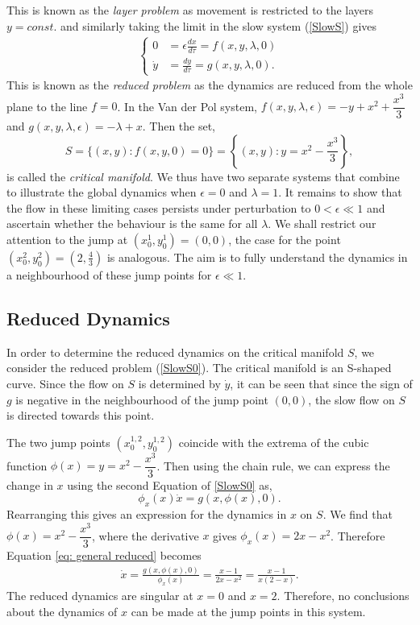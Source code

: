 This is known as the \emph{layer problem} as movement is restricted to the layers $y=const.$ and similarly taking the limit in the slow system (\ref{SlowS}) gives
	\begin{align}\label{SlowS0}
		\begin{cases}
			0 &= \epsilon \frac{dx}{d \tau} = f(x,y,\lambda, 0)\\
			\dot{y} & = \frac{dy}{d \tau} =  g( x,y, \lambda,0).
		\end{cases}
	\end{align}
This is known as the \emph{reduced problem} as the dynamics are reduced from the whole plane to the line $f=0$. In the Van der Pol system, $f(x,y,\lambda,\epsilon)=-y+x^2+\dfrac{x^3}{3}$ and $g(x,y,\lambda,\epsilon)=-\lambda+x$. Then the set,
\begin{equation}
 S= \{ (x,y) : f(x,y,0)=0 \} = \left\{ (x,y) : y = x^2-\dfrac{x^3}{3}\right \},\label{CriticalS}
\end{equation} 
is called the \emph{critical manifold}. We thus have two separate systems that combine to illustrate the global dynamics when $\epsilon =0$ and $\lambda = 1$. It remains to show that the flow in these limiting cases persists under perturbation to $0<\epsilon \ll 1$ and ascertain whether the behaviour is the same for all $\lambda$. We shall restrict our attention to the jump at $ (x^1_0,y^1_0)=(0,0)$, the case for the point $(x^2_0,y^2_0)=(2,\frac{4}{3})$ is analogous. The aim is to fully understand the dynamics in a neighbourhood of these jump points for $\epsilon \ll 1$.

\subsection{Reduced Dynamics}
In order to determine the reduced dynamics on the critical manifold $S$, we consider the reduced problem (\ref{SlowS0}). The critical manifold is  an S-shaped curve. Since the flow on $S$ is determined by $\dot{y}$, it can be seen that since the sign of $g$ is negative in the neighbourhood of the jump point $(0,0)$, the slow flow on $S$ is directed towards this point.

The two jump points $(x_0^{1,2},y_0^{1,2})$ coincide with the extrema of the cubic function  $ \phi(x) = y = x^2-\dfrac{x^3}{3}$.
Then using the chain rule, we can express the change in $x$ using the second Equation of \ref{SlowS0} as,
\begin{equation}
\phi_x(x)\dot{x}=g(x,\phi(x),0).
\label{eq: general reduced}
\end{equation}
Rearranging this gives an expression for the dynamics in $x$ on $S$.
We find that $\phi(x)=x^2-\dfrac{x^3}{3}$, where the derivative \wrt $x$ gives $\phi_x(x)=2x-x^2$.
Therefore Equation \ref{eq: general reduced} becomes 
\begin{align*}
\dot{x} = \frac{g(x,\phi(x),0)}{ \phi_x(x)} = \frac{ x-1}{2x-x^2} =\frac{ x-1}{x(2-x)}.
\end{align*}
The reduced dynamics are singular at $x=0$ and $x=2$. Therefore, no conclusions about the dynamics of $x$ can be made at the jump points in this system. \\ 



